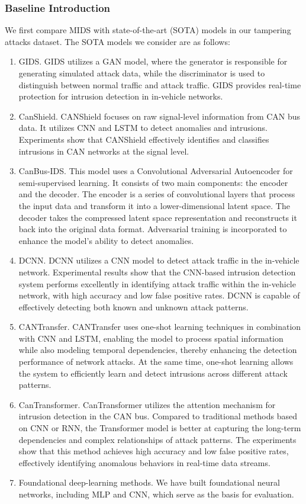 \documentclass[lettersize,journal]{IEEEtran}
\begin{document}
\subsubsection{Baseline Introduction}
We first compare MIDS with state-of-the-art (SOTA) models in our tampering attacks dataset. The SOTA models we consider are as follows:
\begin{enumerate}[label=(\roman*)]
    \item GIDS. GIDS utilizes a GAN model, where the generator is responsible for generating simulated attack data, while the discriminator is used to distinguish between normal traffic and attack traffic. GIDS provides real-time protection for intrusion detection in in-vehicle networks.
    \item CanShield. CANShield focuses on raw signal-level information from CAN bus data. It utilizes CNN and LSTM to detect anomalies and intrusions. Experiments show that CANShield effectively identifies and classifies intrusions in CAN networks at the signal level.
    \item CanBus-IDS. This model uses a Convolutional Adversarial Autoencoder for semi-supervised learning. It consists of two main components: the encoder and the decoder. The encoder is a series of convolutional layers that process the input data and transform it into a lower-dimensional latent space. The decoder takes the compressed latent space representation and reconstructs it back into the original data format. Adversarial training is incorporated to enhance the model's ability to detect anomalies.
    \item DCNN. DCNN utilizes a CNN model to detect attack traffic in the in-vehicle network. Experimental results show that the CNN-based intrusion detection system performs excellently in identifying attack traffic within the in-vehicle network, with high accuracy and low false positive rates. DCNN is capable of effectively detecting both known and unknown attack patterns.
    \item CANTransfer. CANTransfer uses one-shot learning techniques in combination with CNN and LSTM, enabling the model to process spatial information while also modeling temporal dependencies, thereby enhancing the detection performance of network attacks. At the same time, one-shot learning allows the system to efficiently learn and detect intrusions across different attack patterns.
    \item CanTransformer. CanTransformer utilizes the attention mechanism for intrusion detection in the CAN bus. Compared to traditional methods based on CNN or RNN, the Transformer model is better at capturing the long-term dependencies and complex relationships of attack patterns. The experiments show that this method achieves high accuracy and low false positive rates, effectively identifying anomalous behaviors in real-time data streams.
    \item Foundational deep-learning methods. We have built foundational neural networks, including MLP and CNN, which serve as the basis for evaluation.
\end{enumerate}
\end{document}
